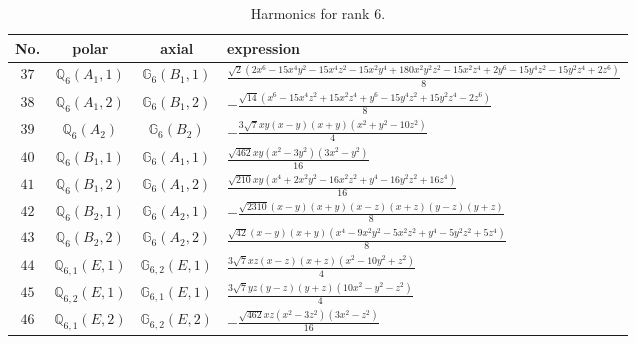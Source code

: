 \documentclass[fleqn,8pt,landscape]{jsarticle}
\begin{document}
\begin{table}[ht!]
\begin{center}
\caption{Harmonics for rank 6.}
\renewcommand{\arraystretch}{1.3}
\begin{tabular}{cccl} \hline \hline
No. & polar & axial & expression \\ \hline
$ 37 $ & $ \mathbb{Q}_{6}(A_{1},1) $ & $ \mathbb{G}_{6}(B_{1},1) $ & $ \frac{\sqrt{2} \left(2 x^{6} - 15 x^{4} y^{2} - 15 x^{4} z^{2} - 15 x^{2} y^{4} + 180 x^{2} y^{2} z^{2} - 15 x^{2} z^{4} + 2 y^{6} - 15 y^{4} z^{2} - 15 y^{2} z^{4} + 2 z^{6}\right)}{8} $ \\
$ 38 $ & $ \mathbb{Q}_{6}(A_{1},2) $ & $ \mathbb{G}_{6}(B_{1},2) $ & $ - \frac{\sqrt{14} \left(x^{6} - 15 x^{4} z^{2} + 15 x^{2} z^{4} + y^{6} - 15 y^{4} z^{2} + 15 y^{2} z^{4} - 2 z^{6}\right)}{8} $ \\
$ 39 $ & $ \mathbb{Q}_{6}(A_{2}) $ & $ \mathbb{G}_{6}(B_{2}) $ & $ - \frac{3 \sqrt{7} x y \left(x - y\right) \left(x + y\right) \left(x^{2} + y^{2} - 10 z^{2}\right)}{4} $ \\
$ 40 $ & $ \mathbb{Q}_{6}(B_{1},1) $ & $ \mathbb{G}_{6}(A_{1},1) $ & $ \frac{\sqrt{462} x y \left(x^{2} - 3 y^{2}\right) \left(3 x^{2} - y^{2}\right)}{16} $ \\
$ 41 $ & $ \mathbb{Q}_{6}(B_{1},2) $ & $ \mathbb{G}_{6}(A_{1},2) $ & $ \frac{\sqrt{210} x y \left(x^{4} + 2 x^{2} y^{2} - 16 x^{2} z^{2} + y^{4} - 16 y^{2} z^{2} + 16 z^{4}\right)}{16} $ \\
$ 42 $ & $ \mathbb{Q}_{6}(B_{2},1) $ & $ \mathbb{G}_{6}(A_{2},1) $ & $ - \frac{\sqrt{2310} \left(x - y\right) \left(x + y\right) \left(x - z\right) \left(x + z\right) \left(y - z\right) \left(y + z\right)}{8} $ \\
$ 43 $ & $ \mathbb{Q}_{6}(B_{2},2) $ & $ \mathbb{G}_{6}(A_{2},2) $ & $ \frac{\sqrt{42} \left(x - y\right) \left(x + y\right) \left(x^{4} - 9 x^{2} y^{2} - 5 x^{2} z^{2} + y^{4} - 5 y^{2} z^{2} + 5 z^{4}\right)}{8} $ \\
$ 44 $ & $ \mathbb{Q}_{6,1}(E,1) $ & $ \mathbb{G}_{6,2}(E,1) $ & $ \frac{3 \sqrt{7} x z \left(x - z\right) \left(x + z\right) \left(x^{2} - 10 y^{2} + z^{2}\right)}{4} $ \\
$ 45 $ & $ \mathbb{Q}_{6,2}(E,1) $ & $ \mathbb{G}_{6,1}(E,1) $ & $ \frac{3 \sqrt{7} y z \left(y - z\right) \left(y + z\right) \left(10 x^{2} - y^{2} - z^{2}\right)}{4} $ \\
$ 46 $ & $ \mathbb{Q}_{6,1}(E,2) $ & $ \mathbb{G}_{6,2}(E,2) $ & $ - \frac{\sqrt{462} x z \left(x^{2} - 3 z^{2}\right) \left(3 x^{2} - z^{2}\right)}{16} $ \\

\end{tabular}
\end{center}
\end{table}
\end{document}
